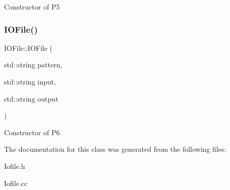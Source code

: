 Constructor of P5 \mbox{\label{classIOFile_a25f35de90baaae5b5b8553802285806b}} 
\subsubsection{\texorpdfstring{I\+O\+File()}{IOFile()}\hspace{0.1cm}{\footnotesize\ttfamily [2/2]}}
{\footnotesize\ttfamily I\+O\+File\+::\+I\+O\+File (\begin{DoxyParamCaption}\item[{std\+::string}]{pattern,  }\item[{std\+::string}]{input,  }\item[{std\+::string}]{output }\end{DoxyParamCaption})}

Constructor of P6 

The documentation for this class was generated from the following files\+:\begin{DoxyCompactItemize}
\item 
Iofile.\+h\item 
Iofile.\+cc\end{DoxyCompactItemize}
